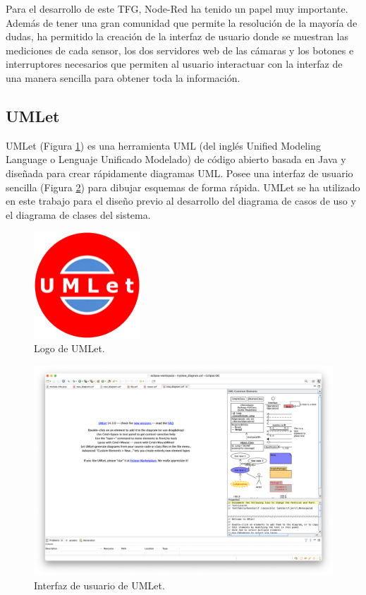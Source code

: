 Para el desarrollo de este TFG, Node-Red ha tenido un papel muy importante. Además de tener una gran comunidad que permite la resolución de la mayoría de dudas, ha permitido la creación de la interfaz de usuario donde se muestran las mediciones de cada sensor, los dos servidores web de las cámaras y los botones e interruptores necesarios que permiten al usuario interactuar con la interfaz de una manera sencilla para obtener toda la información.\\

\subsection{UMLet}
\label{sec:umlet_app}
UMLet (Figura \ref{fig:umlet_logo}) es una herramienta UML (del inglés Unified Modeling Language o Lenguaje Unificado Modelado) de código abierto basada en Java y diseñada para crear rápidamente diagramas UML. Posee una interfaz de usuario sencilla (Figura \ref{fig:ui_umlet}) para dibujar esquemas de forma rápida. UMLet se ha utilizado en este trabajo para el diseño previo al desarrollo del diagrama de casos de uso y el diagrama de clases del sistema.\\
\begin{figure} [h!]
  \begin{center}
    \includegraphics[width=4cm]{figs/umlet_logo}
  \end{center}
  \caption{Logo de UMLet.}
  \label{fig:umlet_logo}
\end{figure}

\begin{figure} [h!]
  \begin{center}
    \includegraphics[width=16cm]{figs/ui_umlet}
  \end{center}
  \caption{Interfaz de usuario de UMLet.}
  \label{fig:ui_umlet}
\end{figure}